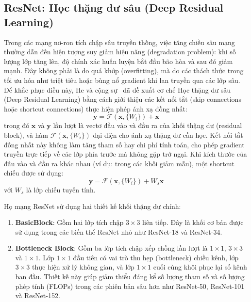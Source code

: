 \documentclass[11pt, a4paper]{article}
\begin{document}
\subsection{ResNet: Học thặng dư sâu (Deep Residual Learning)}

Trong các mạng nơ-ron tích chập sâu truyền thống, việc tăng chiều sâu mạng thường dẫn đến hiện tượng suy giảm hiệu năng (degradation problem): khi số lượng lớp tăng lên, độ chính xác huấn luyện bắt đầu bão hòa và sau đó giảm mạnh. Đây không phải là do quá khớp (overfitting), mà do các thách thức trong tối ưu hóa như triệt tiêu hoặc bùng nổ gradient khi lan truyền qua các lớp sâu. Để khắc phục điều này, He và cộng sự~\cite{he2016deep} đã đề xuất cơ chế Học thặng dư sâu (Deep Residual Learning) bằng cách giới thiệu các kết nối tắt (skip connections hoặc shortcut connections) thực hiện phép ánh xạ đồng nhất:
\begin{equation}\label{eq:residual_block}
    \mathbf{y} = \mathcal{F}(\mathbf{x}, \{W_i\}) + \mathbf{x}
\end{equation}
trong đó $\mathbf{x}$ và $\mathbf{y}$ lần lượt là vectơ đầu vào và đầu ra của khối thặng dư (residual block), và hàm $\mathcal{F}(\mathbf{x}, \{W_i\})$ đại diện cho ánh xạ thặng dư cần học. Kết nối tắt đồng nhất này không làm tăng tham số hay chi phí tính toán, cho phép gradient truyền trực tiếp về các lớp phía trước mà không gặp trở ngại. Khi kích thước của đầu vào và đầu ra khác nhau (ví dụ: trong các khối giảm mẫu), một shortcut chiếu được sử dụng:
\begin{equation}\label{eq:residual_proj}
    \mathbf{y} = \mathcal{F}(\mathbf{x}, \{W_i\}) + W_s \mathbf{x}
\end{equation}
với $W_s$ là lớp chiếu tuyến tính.

Họ mạng ResNet sử dụng hai thiết kế khối thặng dư chính:
\begin{enumerate}
    \item \textbf{BasicBlock}: Gồm hai lớp tích chập $3 \times 3$ liên tiếp. Đây là khối cơ bản được sử dụng trong các biến thể ResNet nhỏ như ResNet-18 và ResNet-34.
    \item \textbf{Bottleneck Block}: Gồm ba lớp tích chập xếp chồng lần lượt là $1 \times 1$, $3 \times 3$ và $1 \times 1$. Lớp $1 \times 1$ đầu tiên có vai trò thu hẹp (bottleneck) chiều kênh, lớp $3 \times 3$ thực hiện xử lý không gian, và lớp $1 \times 1$ cuối cùng khôi phục lại số kênh ban đầu. Thiết kế này giúp giảm thiểu đáng kể số lượng tham số và số lượng phép tính (FLOPs) trong các phiên bản sâu hơn như ResNet-50, ResNet-101 và ResNet-152.
\end{enumerate}
\end{document}
